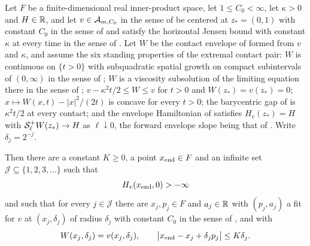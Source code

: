 \begin{lemma}
Let $F$ be a finite-dimensional real inner-product space, let
$1\le C_0<\infty$, let $\kappa>0$ and $H\in\mathbb{R}$, and let $v\in\mathcal{A}_{m,C_0}$
in the sense of  be centered at $z_*=(0,1)$ with constant
$C_0$ in the sense of  and satisfy the horizontal Jensen
bound with constant $\kappa$ at every time in the sense of
. Let $W$ be the contact envelope of
 formed from $v$ and $\kappa$, and assume the six standing
properties of the extremal contact pair: $W$ is continuous on $\{t>0\}$ with
subquadratic spatial growth on compact subintervals of $(0,\infty)$ in the
sense of ; $W$ is a viscosity subsolution of the
limiting equation there in the sense of ;
$v-\kappa^2t/2\le W\le v$ for $t>0$ and $W(z_*)=v(z_*)=0$;
$x\mapsto W(x,t)-|x|^2/(2t)$ is concave for every $t>0$; the barycentric gap of
 is $\kappa^2t/2$ at every contact; and the envelope
Hamiltonian of  satisfies $H_v(z_*)=H$ with
$\mathcal{S}_\ell^+W(z_*)\to H$ as $\ell\downarrow0$, the forward envelope slope being
that of . Write $\delta_j=2^{-j}$.

Then there are a constant $K\ge0$, a point $x_{\rm end}\in F$ and an infinite
set $\mathcal J\subseteq\{1,2,3,\dots\}$ such that
\begin{equation}\label{eq:contact-propagation-conclusion}
  H_v(x_{\rm end},0)>-\infty
\end{equation}
and such that for every $j\in\mathcal J$ there are $x_j,p_j\in F$ and
$a_j\in\mathbb{R}$ with $(p_j,a_j)$ a fit for $v$ at $(x_j,\delta_j)$ of radius
$\delta_j$ with constant $C_0$ in the sense of , and with
\begin{equation}\label{eq:contact-propagation-contact}
  W(x_j,\delta_j)=v(x_j,\delta_j),\qquad
  \bigl|x_{\rm end}-x_j+\delta_jp_j\bigr|\le K\delta_j .
\end{equation}
\end{lemma}
